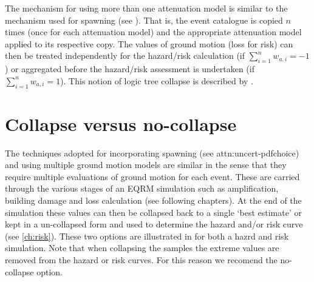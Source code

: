 The mechanism for using more than one attenuation model is similar
to the mechanism used for spawning (see
). That is, the event catalogue is
copied $n$ times (once for each attenuation model) and the
appropriate attenuation model applied to its respective copy. The
values of ground motion (loss for risk) can then be treated
independently for the hazard/risk calculation (if
$\sum_{i=1}^{n}w_{a,i} = -1$) or aggregated before the hazard/risk
assessment is undertaken (if $\sum_{i=1}^{n}w_{a,i} = 1$). This
notion of logic tree collapse is described by
.


\section{Collapse versus no-collapse}

The techniques adopted for incorporating spawning (see \sref
{attn:uncert-pdfchoice}) and using multiple ground motion models are
similar in the sense that they require multiple evaluations of
ground motion for each event. These are carried through the various
stages of an EQRM simulation such as amplification, building damage
and loss calculation (see following chapters). At the end of the
simulation these values can then be collapsed back to a single `best
estimate' or kept in a un-collapsed form and used to determine the
hazard and/or risk curve (see \cref{ch:risk}). These two options are
illustrated in  for both a hazrd and
risk simulation. Note that when collapsing the samples the extreme
values are removed from the hazard or risk curves. For this reason
we recomend the no-collapse option.

